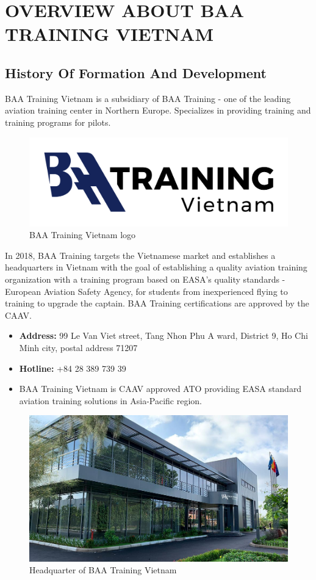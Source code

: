 \chapter{OVERVIEW ABOUT BAA TRAINING VIETNAM}

\renewcommand{\headrulewidth}{0.5pt}
\renewcommand{\footrulewidth}{0.5pt}
\thispagestyle{plain}
\pagestyle{fancy}
\fancyhf{}
\raggedright
{}

\section{History Of Formation And Development}
    BAA Training Vietnam is a subsidiary of BAA Training - one of the leading aviation training center in Northern Europe. 
    Specializes in providing training and training programs for pilots. \\ 
    \begin{figure}[H]
        \centering
        \includegraphics[width=0.6\linewidth]{img/company-logo.png}
        \caption{BAA Training Vietnam logo}
    \end{figure}
    In 2018, BAA Training targets the Vietnamese market and establishes a headquarters in Vietnam with the goal of establishing 
    a quality aviation training organization with a training program based on EASA's quality standards - 
    European Aviation Safety Agency, for students from inexperienced flying to training to upgrade the captain. BAA Training 
    certifications are approved by the CAAV.
    \begin{itemize}
        \item \textbf{Address:} 99 Le Van Viet street, Tang Nhon Phu A ward, District 9, Ho Chi Minh city, postal address 71207
        \item \textbf{Hotline:} +84 28 389 739 39
        \item BAA Training Vietnam is CAAV approved ATO providing EASA standard aviation training solutions in Asia-Pacific region.
    \end{itemize}
    \begin{figure}[H]
        \centering
        \includegraphics[width=0.6\linewidth]{img/company.jpg}
        \caption{Headquarter of BAA Training Vietnam}
    \end{figure}

